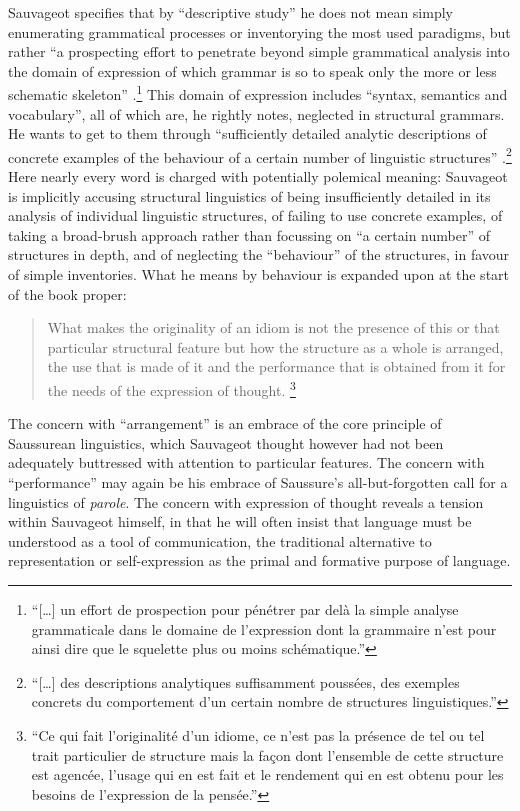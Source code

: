\documentclass[output=paper]{langscibook}
\begin{document}
Sauvageot specifies that by ``descriptive study'' he does not mean simply enumerating grammatical processes or inventorying the most used paradigms, but rather ``a prospecting effort to penetrate beyond simple grammatical analysis into the domain of expression of which grammar is so to speak only the more or less schematic skeleton'' \citep[7]{Sauvageot1946}.\footnote{``[…] un effort de prospection pour pénétrer par delà la simple analyse grammaticale dans le domaine de l'expression dont la grammaire n'est pour ainsi dire que le squelette plus ou moins schématique.''} This domain of expression includes ``syntax, semantics and vocabulary'', all of which are, he rightly notes, neglected in structural grammars. He wants to get to them through ``sufficiently detailed analytic descriptions of concrete examples of the behaviour of a certain number of linguistic structures'' \citep[7]{Sauvageot1946}.\footnote{``[…] des descriptions analytiques suffisamment poussées, des exemples concrets du comportement d'un certain nombre de structures linguistiques.''} Here nearly every word is charged with potentially polemical meaning: Sauvageot is implicitly accusing structural linguistics of being insufficiently detailed in its analysis of individual linguistic structures, of failing to use concrete examples, of taking a broad-brush approach rather than focussing on ``a certain number'' of structures in depth, and of neglecting the ``behaviour'' of the structures, in favour of simple inventories. What he means by behaviour is expanded upon at the start of the book proper: 

\largerpage[1]\begin{quotation}
What makes the originality of an idiom is not the presence of this or that particular structural feature but how the structure as a whole is arranged, the use that is made of it and the performance that is obtained from it for the needs of the expression of thought. \citep[13]{Sauvageot1946}\footnote{``Ce qui fait l'originalité d'un idiome, ce n'est pas la présence de tel ou tel trait particulier de structure mais la façon dont l'ensemble de cette structure est agencée, l'usage qui en est fait et le rendement qui en est obtenu pour les besoins de l'expression de la pensée.''} 
\end{quotation}

The concern with ``arrangement'' is an embrace of the core principle of Saussurean linguistics, which Sauvageot thought however had not been adequately buttressed with attention to particular features. The concern with ``performance'' may again be his embrace of Saussure's all-but-forgotten call for a linguistics of \emph{parole}. The concern with expression of thought reveals a tension within Sauvageot himself, in that he will often insist that language must be understood as a tool of communication, the traditional alternative to representation or self-expression as the primal and formative purpose of language.
\end{document}
